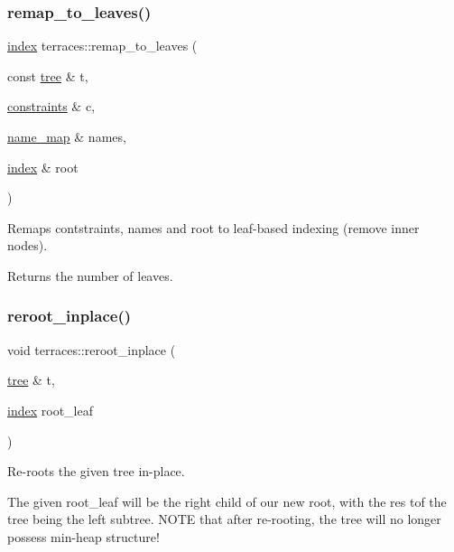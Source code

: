 \subsubsection{\texorpdfstring{remap\+\_\+to\+\_\+leaves()}{remap\_to\_leaves()}}
{\footnotesize\ttfamily \hyperlink{namespaceterraces_adbc33ccb543d1634e96d0eb02e472c77}{index} terraces\+::remap\+\_\+to\+\_\+leaves (\begin{DoxyParamCaption}\item[{const \hyperlink{namespaceterraces_a07aaf7feec4a22c6cdefc14c5a81bdd0}{tree} \&}]{t,  }\item[{\hyperlink{namespaceterraces_a6f603ffd30ed4d902fce6424492e0581}{constraints} \&}]{c,  }\item[{\hyperlink{namespaceterraces_a4ef0217fe5aed881737d9bc5a8d45dca}{name\+\_\+map} \&}]{names,  }\item[{\hyperlink{namespaceterraces_adbc33ccb543d1634e96d0eb02e472c77}{index} \&}]{root }\end{DoxyParamCaption})}

Remaps contstraints, names and root to leaf-\/based indexing (remove inner nodes). \begin{DoxyReturn}{Returns}
the number of leaves. 
\end{DoxyReturn}
\mbox{\label{namespaceterraces_ae8abab19d1c4a35eb187cd2cf005fe59}} 
\subsubsection{\texorpdfstring{reroot\+\_\+inplace()}{reroot\_inplace()}}
{\footnotesize\ttfamily void terraces\+::reroot\+\_\+inplace (\begin{DoxyParamCaption}\item[{\hyperlink{namespaceterraces_a07aaf7feec4a22c6cdefc14c5a81bdd0}{tree} \&}]{t,  }\item[{\hyperlink{namespaceterraces_adbc33ccb543d1634e96d0eb02e472c77}{index}}]{root\+\_\+leaf }\end{DoxyParamCaption})}

Re-\/roots the given tree in-\/place.

The given root\+\_\+leaf will be the right child of our new root, with the res tof the tree being the left subtree. N\+O\+TE that after re-\/rooting, the tree will no longer possess min-\/heap structure! \mbox{\label{namespaceterraces_a6878b4ce33b96891a13f1336ee330746}} 
